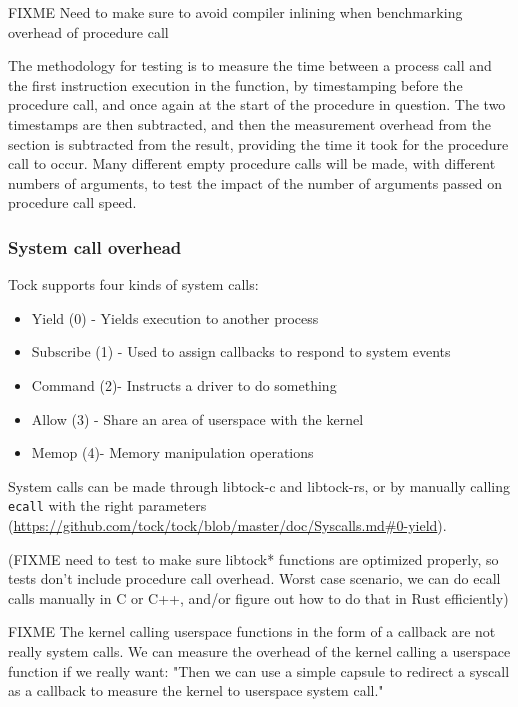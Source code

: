 \documentclass{article}
\begin{document}
FIXME Need to make sure to avoid compiler inlining when benchmarking overhead of procedure call

The methodology for testing is to measure the time between a process call and the first instruction execution in the function, by timestamping before the procedure call, and once again at the start of the procedure in question. The two timestamps are then subtracted, and then the measurement overhead from the  section is subtracted from the result, providing the time it took for the procedure call to occur. Many different empty procedure calls will be made, with different numbers of arguments, to test the impact of the number of arguments passed on procedure call speed.

\subsubsection{System call overhead} \label{sec:syscalls}

Tock supports four kinds of system calls:
\begin{itemize}
    \item Yield (0) - Yields execution to another process
    \item Subscribe (1) - Used to assign callbacks to respond to system events
    \item Command (2)- Instructs a driver to do something
    \item Allow (3) - Share an area of userspace with the kernel
    \item Memop (4)- Memory manipulation operations
\end{itemize}

System calls can be made through libtock-c and libtock-rs, or by manually calling \texttt{ecall} with the right parameters (\url{https://github.com/tock/tock/blob/master/doc/Syscalls.md#0-yield}).

(FIXME need to test to make sure libtock* functions are optimized properly, so tests don't include procedure call overhead. Worst case scenario, we can do ecall calls manually in C or C++, and/or figure out how to do that in Rust efficiently)

FIXME The kernel calling userspace functions in the form of a callback are not really system calls. We can measure the overhead of the kernel calling a userspace function if we really want: "Then we can use a simple capsule to redirect a syscall as a callback to measure the kernel to userspace system call."
\end{document}

